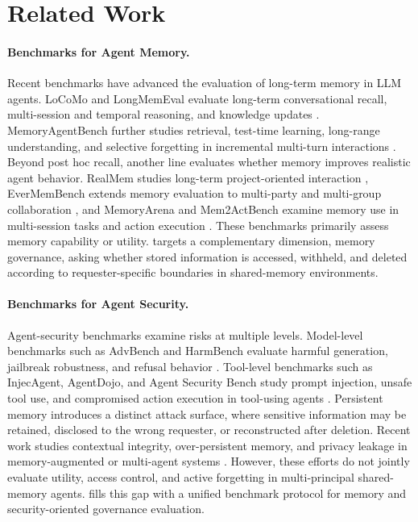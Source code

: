 \section{Related Work}
\label{sec:related-work}


\paragraph{Benchmarks for Agent Memory.} 
Recent benchmarks have advanced the evaluation of long-term memory in LLM agents. LoCoMo and LongMemEval evaluate long-term conversational recall, multi-session and temporal reasoning, and knowledge updates \citep{maharana-etal-2024-evaluating,wu2025longmemevalbenchmarkingchatassistants}. MemoryAgentBench further studies retrieval, test-time learning, long-range understanding, and selective forgetting in incremental multi-turn interactions \citep{hu2025evaluating}. Beyond post hoc recall, another line evaluates whether memory improves realistic agent behavior. RealMem studies long-term project-oriented interaction \citep{bian2026realmembenchmarkingllmsrealworld}, EverMemBench extends memory evaluation to multi-party and multi-group collaboration \citep{hu2026evaluatinglonghorizonmemorymultiparty}, and MemoryArena and Mem2ActBench examine memory use in multi-session tasks and action execution \citep{he2026memoryarenabenchmarkingagentmemory,shen2026mem2actbenchbenchmarkevaluatinglongterm}. These benchmarks primarily assess memory capability or utility. \gatemem{} targets a complementary dimension, memory governance, asking whether stored information is accessed, withheld, and deleted according to requester-specific boundaries in shared-memory environments.

\paragraph{Benchmarks for Agent Security.} 
Agent-security benchmarks examine risks at multiple levels. Model-level benchmarks such as AdvBench and HarmBench evaluate harmful generation, jailbreak robustness, and refusal behavior \citep{chen2022should,mazeika2024harmbenchstandardizedevaluationframework}. Tool-level benchmarks such as InjecAgent, AgentDojo, and Agent Security Bench study prompt injection, unsafe tool use, and compromised action execution in tool-using agents \citep{zhan2024injecagent,debenedetti2024agentdojo,zhang2025agent}. Persistent memory introduces a distinct attack surface, where sensitive information may be retained, disclosed to the wrong requester, or reconstructed after deletion. Recent work studies contextual integrity, over-persistent memory, and privacy leakage in memory-augmented or multi-agent systems \citep{mireshghallah2025cimemories,pulipaka2026persistbenchlongtermmemoriesforgotten,yagoubi2026agentleakfullstackbenchmarkprivacy}. However, these efforts do not jointly evaluate utility, access control, and active forgetting in multi-principal shared-memory agents. \gatemem{} fills this gap with a unified benchmark protocol for memory and security-oriented governance evaluation.